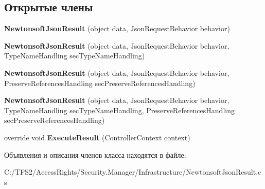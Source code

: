\subsection*{Открытые члены}
\begin{DoxyCompactItemize}
\item 
\mbox{\label{class_security_1_1_manager_1_1_infrastructure_1_1_newtonsoft_json_result_aeabfa1a5a86ddb3f026ecb95a829ae51}} 
{\bfseries Newtonsoft\+Json\+Result} (object data, Json\+Request\+Behavior behavior)
\item 
\mbox{\label{class_security_1_1_manager_1_1_infrastructure_1_1_newtonsoft_json_result_a3b659157768d6902be3ca5a254e069a7}} 
{\bfseries Newtonsoft\+Json\+Result} (object data, Json\+Request\+Behavior behavior, Type\+Name\+Handling sec\+Type\+Name\+Handling)
\item 
\mbox{\label{class_security_1_1_manager_1_1_infrastructure_1_1_newtonsoft_json_result_a1d3e0fba638dcd2b5679ae2ba59d2264}} 
{\bfseries Newtonsoft\+Json\+Result} (object data, Json\+Request\+Behavior behavior, Preserve\+References\+Handling sec\+Preserve\+References\+Handling)
\item 
\mbox{\label{class_security_1_1_manager_1_1_infrastructure_1_1_newtonsoft_json_result_a9b1dbd1e866f493e587965f0bcaba598}} 
{\bfseries Newtonsoft\+Json\+Result} (object data, Json\+Request\+Behavior behavior, Type\+Name\+Handling sec\+Type\+Name\+Handling, Preserve\+References\+Handling sec\+Preserve\+References\+Handling)
\item 
\mbox{\label{class_security_1_1_manager_1_1_infrastructure_1_1_newtonsoft_json_result_af717877380bea4c8ecd6f8e8ee3ad5ad}} 
override void {\bfseries Execute\+Result} (Controller\+Context context)
\end{DoxyCompactItemize}


Объявления и описания членов класса находятся в файле\+:\begin{DoxyCompactItemize}
\item 
C\+:/\+T\+F\+S2/\+Access\+Rights/\+Security.\+Manager/\+Infrastructure/Newtonsoft\+Json\+Result.\+cs\end{DoxyCompactItemize}
